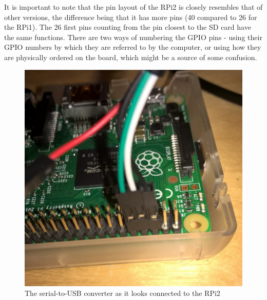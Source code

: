 \documentclass[a4paper,11pt,reqno]{amsart}
\begin{document}
It is important to note that the pin layout of the RPi2 is closely resembles that of other versions, the difference being that it has more pins (40 compared to 26 for the RPi1). The 26 first pins counting from the pin closest to the SD card have the same functions. There are two ways of numbering the GPIO pins - using their GPIO numbers by which they are referred to by the computer, or using how they are physically ordered on the board, which might be a source of some confusion.
\begin{figure}[hb]
\begin{center}
   \includegraphics[scale=0.3]{connection.png}
 \end{center}
 \caption{The serial-to-USB converter as it looks connected to the RPi2}
 \label{fig:conn}
\end{figure}
\end{document}
